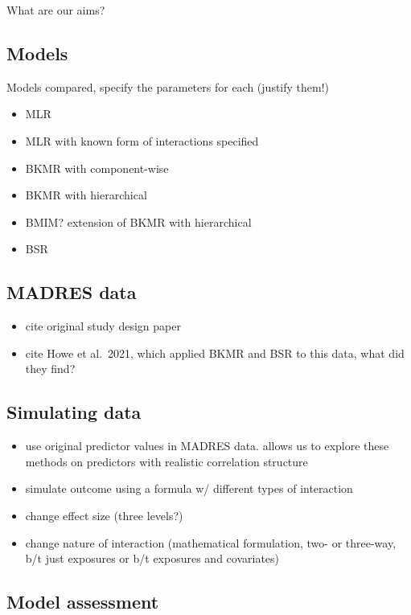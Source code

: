 \documentclass[12pt, twoside]{amherstthesis}
\providecommand{\tightlist}{%
  \setlength{\itemsep}{0pt}\setlength{\parskip}{0pt}}
\begin{document}
What are our aims?

\hypertarget{models}{%
\subsection{Models}\label{models}}

Models compared, specify the parameters for each (justify them!)
\begin{itemize}
\tightlist
\item
  MLR
\item
  MLR with known form of interactions specified
\item
  BKMR with component-wise
\item
  BKMR with hierarchical
\item
  BMIM? extension of BKMR with hierarchical
\item
  BSR
\end{itemize}
\hypertarget{madres-data}{%
\subsection{MADRES data}\label{madres-data}}
\begin{itemize}
\tightlist
\item
  cite original study design paper
\item
  cite Howe et al.~2021, which applied BKMR and BSR to this data, what did they find?
\end{itemize}
\hypertarget{simulating-data}{%
\subsection{Simulating data}\label{simulating-data}}
\begin{itemize}
\tightlist
\item
  use original predictor values in MADRES data. allows us to explore these methods on predictors with realistic correlation structure
\item
  simulate outcome using a formula w/ different types of interaction
\item
  change effect size (three levels?)
\item
  change nature of interaction (mathematical formulation, two- or three-way, b/t just exposures or b/t exposures and covariates)
\end{itemize}
\hypertarget{model-assessment}{%
\subsection{Model assessment}\label{model-assessment}}
\end{document}
